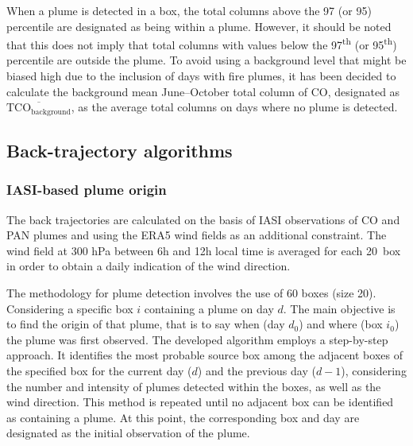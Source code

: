 \documentclass[acp, manuscript]{copernicus}
\begin{document}
When a plume is detected in a box, the total columns above the 97 (or 95) percentile are designated as being within a plume. However, it should be noted that this does not imply that total columns with values below the 97\textsuperscript{th} (or 95\textsuperscript{th}) percentile are outside the plume. To avoid using a background level that might be biased high due to the inclusion of days with fire plumes, it has been decided to calculate the background mean June--October total column of CO, designated as $\overline{\text{TCO}_{\text{background}}}$, as the average total columns on days where no plume is detected. 


\subsection{Back-trajectory algorithms}\label{back_trajectory_algorithm_chap4}


\subsubsection{IASI-based plume origin}

The back trajectories are calculated on the basis of IASI observations of CO and PAN plumes and using the ERA5 wind fields \citep{hersbachERA5GlobalReanalysis2020a} as an additional constraint. The wind field at 300 hPa between 6h and 12h local time is averaged for each 20\textdegree {}\textdegree\ box in order to obtain a daily indication of the wind direction.

The methodology for plume detection involves the use of 60 boxes (size 20\textdegree {}\textdegree).
Considering a specific box $i$ containing a plume on day $d$. The main objective is to find the origin of that plume, that is to say when (day $d_0$) and where (box $i_0$) the plume was first observed. 
The developed algorithm employs a step-by-step approach. It identifies the most probable source box among the adjacent boxes of the specified box for the current day ($d$) and the previous day ($d-1$), considering the number and intensity of plumes detected within the boxes, as well as the wind direction. This method is repeated until no adjacent box can be identified as containing a plume. At this point, the corresponding box and day are designated as the initial observation of the plume.
\end{document}
